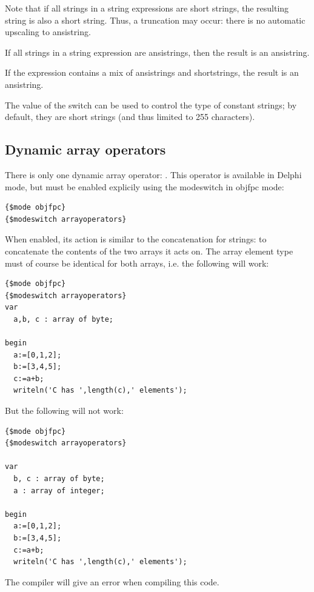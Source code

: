Note that if all strings in a string expressions are short strings, the
resulting string is also a short string. Thus, a truncation may occur:
there is no automatic upscaling to ansistring.

If all strings in a string expression are ansistrings, then the result is an
ansistring.

If the expression contains a mix of ansistrings and shortstrings, the result
is an ansistring.

The value of the  switch can be used to control the type of
constant strings; by default, they are short strings (and thus limited to
255 characters).

%
\subsection{Dynamic array operators}
There is only one dynamic array operator: \var{+}. This operator is
available in Delphi mode, but must be enabled explicily using the modeswitch
 in objfpc mode:
\begin{verbatim}
{$mode objfpc}
{$modeswitch arrayoperators}
\end{verbatim}
When enabled, its action is similar to
the concatenation for strings: to concatenate the contents of the two arrays it acts on.
The array element type must of course be identical for both arrays, i.e. the
following will work:
\begin{verbatim}
{$mode objfpc}
{$modeswitch arrayoperators}
var
  a,b, c : array of byte;

begin
  a:=[0,1,2];
  b:=[3,4,5];
  c:=a+b;
  writeln('C has ',length(c),' elements');
\end{verbatim}
But the following will not work:
\begin{verbatim}
{$mode objfpc}
{$modeswitch arrayoperators}

var
  b, c : array of byte;
  a : array of integer;

begin
  a:=[0,1,2];
  b:=[3,4,5];
  c:=a+b;
  writeln('C has ',length(c),' elements');
\end{verbatim}
The compiler will give an error when compiling this code.

%
